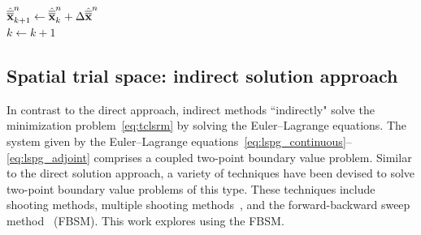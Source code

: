 \begin{algorithm}
{$\hat{\overline{\overline{\mathbf {x}}}}^{n}_{k+1} \leftarrow \hat{\overline{\overline{\mathbf {x}}}}^{n}_k + \Delta \hat{\overline{\overline{\mathbf {x}}}}^{n}$  \\
$k\leftarrow k+1$
}
\end{algorithm}


%

\subsection{Spatial trial space: indirect solution approach}\label{sec:indirect}
In contrast to the direct approach,
indirect methods ``indirectly" solve the minimization
problem~\eqref{eq:tclsrm} by solving the Euler--Lagrange equations. The
system given by the Euler--Lagrange equations~\eqref{eq:lspg_continuous}--\eqref{eq:lspg_adjoint} comprises a coupled two-point boundary value
problem. Similar to the direct solution approach, a variety of techniques have
been devised to solve two-point boundary value problems of this type. These
techniques include shooting methods, multiple shooting
methods~\cite{multiple_shooting}, and the forward-backward sweep
method~\cite{fbs} (FBSM).  This work explores using the FBSM. 


